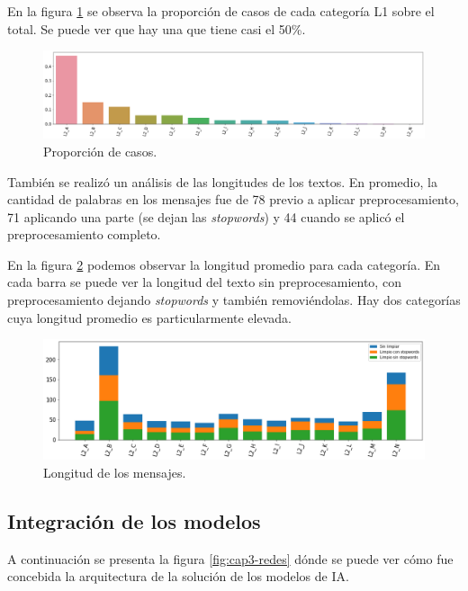 En la figura \ref{fig:cap3-distribucion} se observa la proporción de casos de cada categoría L1 sobre el total. Se puede ver que hay una que tiene casi el 50\%.

\begin{figure}[htb]
	\centering
	\includegraphics[width=1\textwidth]{./Figures/cap3-distribucion.png}
	\caption{Proporción de casos.}
	\label{fig:cap3-distribucion}
\end{figure}

También se realizó un análisis de las longitudes de los textos. En promedio, la cantidad de palabras en los mensajes fue de 78 previo a aplicar preprocesamiento, 71 aplicando una parte (se dejan las \textit{stopwords}) y 44 cuando se aplicó el preprocesamiento completo.

En la figura \ref{fig:cap3-longitudes} podemos observar la longitud promedio para cada categoría. En cada barra se puede ver la longitud del texto sin preprocesamiento, con preprocesamiento dejando \textit{stopwords} y también removiéndolas. Hay dos categorías cuya longitud promedio es particularmente elevada.

\begin{figure}[htbp]
	\centering
	\includegraphics[width=1\textwidth]{./Figures/cap3-longitudes.png}
	\caption{Longitud de los mensajes.}
	\label{fig:cap3-longitudes}
\end{figure}

\subsection{Integración de los modelos}

A continuación se presenta la figura \ref{fig:cap3-redes} dónde se puede ver cómo fue concebida la arquitectura de la solución de los modelos de IA.

